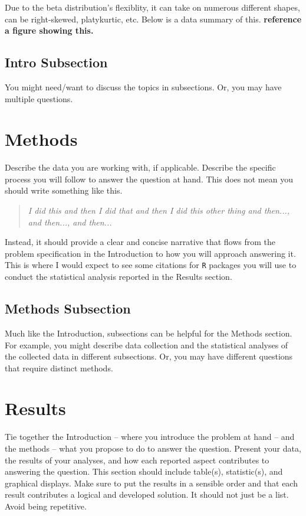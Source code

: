 \documentclass{article}\usepackage[]{graphicx}\usepackage[]{xcolor}
\newenvironment{Figure}
  {\par\medskip\noindent\minipage{\linewidth}}
  {\endminipage\par\medskip}
\begin{document}
\begin{multicols}{2}
Due to the beta distribution's flexiblity, it can take on numerous different shapes, can be right-skewed, platykurtic, etc. Below is a data summary of this. 
\textbf{reference a figure showing this.}

\subsection{Intro Subsection}
You might need/want to discuss the topics in subsections. Or, you may have multiple questions.


\section{Methods}
Describe the data you are working with, if applicable. Describe the specific process you will follow to answer the question at hand. This does not mean you should write something like this.
\begin{quote}
\textit{I did this and then I did that and then I did this other thing and then..., and then..., and then...}
\end{quote}
Instead, it should provide a clear and concise narrative that flows from the problem specification in the Introduction to how you will approach answering it. This is where I would expect to see some citations for \texttt{R} packages you will use to conduct the statistical analysis reported in the Results section.


\subsection{Methods Subsection}
Much like the Introduction, subsections can be helpful for the Methods section. For example, you might describe data collection and the statistical analyses of the collected data in different subsections. Or, you may have different questions that require distinct methods. 

\section{Results}
Tie together the Introduction -- where you introduce the problem at hand -- and the methods --  what you propose to do to answer the question. Present your data, the results of your analyses, and how each reported aspect contributes to answering the question. This section should include table(s), statistic(s), and graphical displays. Make sure to put the results in a sensible order and that each result contributes a logical and developed solution. It should not just be a list. Avoid being repetitive. 


\end{multicols}
\end{document}
